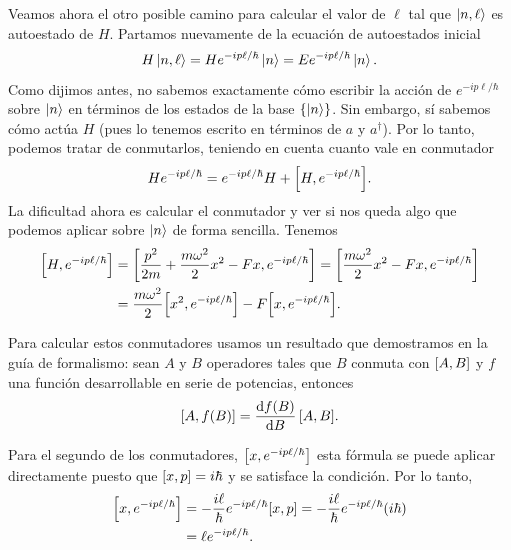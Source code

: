 \documentclass[10pt, a4paper]{article}
\numberwithin{equation}{subsection}
\begin{document}
Veamos ahora el otro posible camino para calcular el valor de $\ell$ tal que
$\ket{n,\ell}$ es autoestado de $H$. Partamos nuevamente de la ecuación de
autoestados inicial
\begin{equation}
  H\ket{n,\ell} = He^{-ip\ell/\hbar}\ket{n} = Ee^{-ip\ell/\hbar}\ket{n}.
\end{equation}
Como dijimos antes, no sabemos exactamente cómo escribir la acción de
$e^{-ip\ell/\hbar}$ sobre $\ket{n}$ en términos de los estados de la base
$\set{\ket{n}}$. Sin embargo, sí sabemos cómo actúa $H$ (pues lo tenemos
escrito en términos de $a$ y $a^\dagger$). Por lo tanto, podemos tratar de
conmutarlos, teniendo en cuenta cuanto vale en conmutador
\begin{equation}
  He^{-ip\ell/\hbar} = e^{-ip\ell/\hbar}H + \comm{H}{e^{-ip\ell/\hbar}}.
\end{equation}
La dificultad ahora es calcular el conmutador y ver si nos queda algo que
podemos aplicar sobre $\ket{n}$ de forma sencilla. Tenemos
\begin{align}
  \comm{H}{e^{-ip\ell/\hbar}} &= \comm{\frac{p^2}{2m} +
    \frac{m\omega^2}{2}x^2 - Fx}{e^{-ip\ell/\hbar}} =
    \comm{\frac{m\omega^2}{2}x^2 - Fx}{e^{-ip\ell/\hbar}} \\
  &= \frac{m\omega^2}{2}\comm{x^2}{e^{-ip\ell/\hbar}} -
    F\comm{x}{e^{-ip\ell/\hbar}}.
\end{align}

Para calcular estos conmutadores usamos un resultado que demostramos en la guía
de formalismo: sean $A$ y $B$ operadores tales que $B$ conmuta con
$\comm{A}{B}$ y $f$ una función desarrollable en serie de potencias, entonces
\begin{equation}
  \comm{A}{f(B)} = \dv{f(B)}{B} \,\comm{A}{B}.
\end{equation}

Para el segundo de los conmutadores, $\comm{x}{e^{-ip\ell/\hbar}}$ esta fórmula
se puede aplicar directamente puesto que $\comm{x}{p} = i\hbar$ y se satisface
la condición. Por lo tanto,
\begin{align}
  \comm{x}{e^{-ip\ell/\hbar}} &= -\frac{i\ell}{\hbar} e^{-ip\ell/\hbar}
    \comm{x}{p} = -\frac{i\ell}{\hbar} e^{-ip\ell/\hbar} (i\hbar) \\
  &= \ell e^{-ip\ell/\hbar}.
\end{align}
\end{document}
